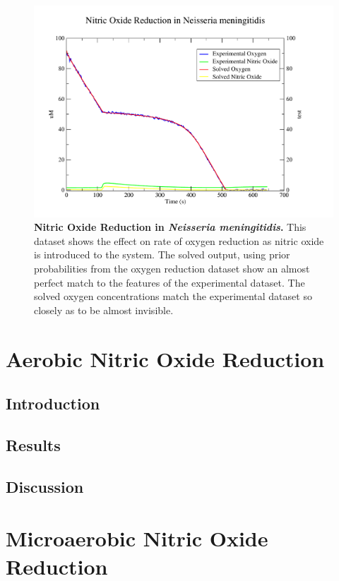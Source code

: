 \begin{figure}[ht!]
 \centering
 \includegraphics[width=14cm]{./06-noreduction/data/nosim.pdf}
 \caption[{Nitric Oxide Reduction in \textit{Neisseria meningitidis}.}]{{\bf Nitric Oxide Reduction in \textit{Neisseria meningitidis}.} This dataset shows the effect on rate of oxygen reduction as nitric oxide is introduced to the system. The solved output, using prior probabilities from the oxygen reduction dataset show an almost perfect match to the features of the experimental dataset. The solved oxygen concentrations match the experimental dataset so closely as to be almost invisible.}
 \label{fig:nosim}
\end{figure}

\section{Aerobic Nitric Oxide Reduction}
\subsection{Introduction}
\subsection{Results}
\subsection{Discussion}
\section{Microaerobic Nitric Oxide Reduction}
